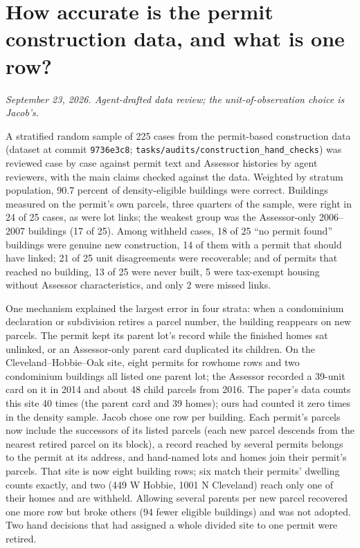 \clearpage
\section*{How accurate is the permit construction data, and what is one row?}
\textit{September 23, 2026. Agent-drafted data review; the unit-of-observation choice is Jacob's.}

A stratified random sample of 225 cases from the permit-based construction data (dataset at commit
\texttt{9736e3c8}; \texttt{tasks/audits/construction\_hand\_checks}) was reviewed case by case against permit text
and Assessor histories by agent reviewers, with the main claims checked against the data. Weighted by stratum
population, 90.7 percent of density-eligible buildings were correct. Buildings measured on the permit's own parcels,
three quarters of the sample, were right in 24 of 25 cases, as were lot links; the weakest group was the
Assessor-only 2006--2007 buildings (17 of 25). Among withheld cases, 18 of 25 ``no permit found'' buildings were
genuine new construction, 14 of them with a permit that should have linked; 21 of 25 unit disagreements were
recoverable; and of permits that reached no building, 13 of 25 were never built, 5 were tax-exempt housing without
Assessor characteristics, and only 2 were missed links.

One mechanism explained the largest error in four strata: when a condominium declaration or subdivision retires a
parcel number, the building reappears on new parcels. The permit kept its parent lot's record while the finished
homes sat unlinked, or an Assessor-only parent card duplicated its children. On the Cleveland--Hobbie--Oak site,
eight permits for rowhome rows and two condominium buildings all listed one parent lot; the Assessor recorded a
39-unit card on it in 2014 and about 48 child parcels from 2016. The paper's data counts this site 40 times (the
parent card and 39 homes); ours had counted it zero times in the density sample. Jacob chose one row per building.
Each permit's parcels now include the successors of its listed parcels (each new parcel descends from the nearest
retired parcel on its block), a record reached by several permits belongs to the permit at its address, and
hand-named lots and homes join their permit's parcels. That site is now eight building rows; six match their
permits' dwelling counts exactly, and two (449 W Hobbie, 1001 N Cleveland) reach only one of their homes and are
withheld. Allowing several parents per new parcel recovered one more row but broke others (94 fewer eligible
buildings) and was not adopted. Two hand decisions that had assigned a whole divided site to one permit were retired.

